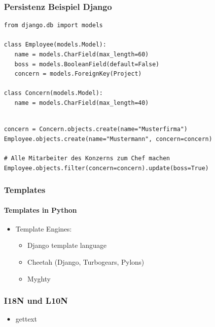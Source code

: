 \documentclass[
    t,
    smaller,
    compress,
]{beamer}
\begin{document}
\begin{frame}[fragile]
  \frametitle{Persistenz Beispiel Django}
  
\begin{lstlisting}
from django.db import models
    
class Employee(models.Model):
   name = models.CharField(max_length=60)
   boss = models.BooleanField(default=False)
   concern = models.ForeignKey(Project)

class Concern(models.Model):   
   name = models.CharField(max_length=40)
\end{lstlisting}
  
\begin{lstlisting}

concern = Concern.objects.create(name="Musterfirma")
Employee.objects.create(name="Mustermann", concern=concern)
	
# Alle Mitarbeiter des Konzerns zum Chef machen
Employee.objects.filter(concern=concern).update(boss=True) 
\end{lstlisting}
  
  
\end{frame}



\begin{frame}
  \frametitle{Templates}
  \framesubtitle{Templates in Python}
  \begin{itemize}[<1->]
    \item Template Engines:
        \begin{itemize}[<1->]
            \item Django template language
            \item Cheetah (Django, Turbogears, Pylons)
            \item Myghty
        \end{itemize}
  \end{itemize}

\end{frame}

\begin{frame}
  \frametitle{I18N und L10N}
  \begin{itemize}[<1->]
    \item gettext
  \end{itemize}
\end{frame}
\end{document}

